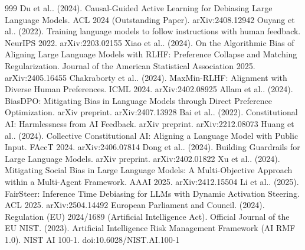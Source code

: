\documentclass[10pt]{article}
\begin{document}
\begin{thebibliography}{999}
 Du et al.. (2024). Causal-Guided Active Learning for Debiasing Large Language Models. ACL 2024 (Outstanding Paper). arXiv:2408.12942
 Ouyang et al.. (2022). Training language models to follow instructions with human feedback. NeurIPS 2022. arXiv:2203.02155
 Xiao et al.. (2024). On the Algorithmic Bias of Aligning Large Language Models with RLHF: Preference Collapse and Matching Regularization. Journal of the American Statistical Association 2025. arXiv:2405.16455
 Chakraborty et al.. (2024). MaxMin-RLHF: Alignment with Diverse Human Preferences. ICML 2024. arXiv:2402.08925
 Allam et al.. (2024). BiasDPO: Mitigating Bias in Language Models through Direct Preference Optimization. arXiv preprint. arXiv:2407.13928
 Bai et al.. (2022). Constitutional AI: Harmlessness from AI Feedback. arXiv preprint. arXiv:2212.08073
 Huang et al.. (2024). Collective Constitutional AI: Aligning a Language Model with Public Input. FAccT 2024. arXiv:2406.07814
 Dong et al.. (2024). Building Guardrails for Large Language Models. arXiv preprint. arXiv:2402.01822
 Xu et al.. (2024). Mitigating Social Bias in Large Language Models: A Multi-Objective Approach within a Multi-Agent Framework. AAAI 2025. arXiv:2412.15504
 Li et al.. (2025). FairSteer: Inference Time Debiasing for LLMs with Dynamic Activation Steering. ACL 2025. arXiv:2504.14492
 European Parliament and Council. (2024). Regulation (EU) 2024/1689 (Artificial Intelligence Act). Official Journal of the EU
 NIST. (2023). Artificial Intelligence Risk Management Framework (AI RMF 1.0). NIST AI 100-1. doi:10.6028/NIST.AI.100-1
\end{thebibliography}
\end{document}
